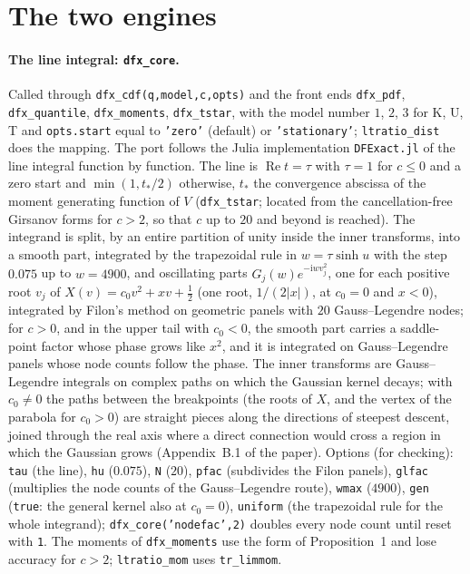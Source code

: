 \documentclass[11pt]{article}
\newcommand{\code}[1]{\texttt{#1}}
\newcommand{\iu}{{\mathrm i}}
\newcommand{\Rea}{\operatorname{Re}}
\begin{document}
\section{The two engines}
\label{sec:engines}

\paragraph{The line integral: \code{dfx\_core}.}  Called through \code{dfx\_cdf(q,model,c,opts)} and the front ends \code{dfx\_pdf}, \code{dfx\_quantile}, \code{dfx\_moments}, \code{dfx\_tstar}, with the model number $1$, $2$, $3$ for \textsf{K}, \textsf{U}, \textsf{T} and \code{opts.start} equal to \code{'zero'} (default) or \code{'stationary'}; \code{ltratio\_dist} does the mapping.  The port follows the Julia implementation \code{DFExact.jl} of the line integral function by function.  The line is $\Rea t=\tau$ with $\tau=1$ for $c\le0$ and a zero start and $\min(1,t_*/2)$ otherwise, $t_*$ the convergence abscissa of the moment generating function of $V$ (\code{dfx\_tstar}; located from the cancellation-free Girsanov forms for $c>2$, so that $c$ up to $20$ and beyond is reached).  The integrand is split, by an entire partition of unity inside the inner transforms, into a smooth part, integrated by the trapezoidal rule in $w=\tau\sinh u$ with the step $0.075$ up to $w=4900$, and oscillating parts $G_j(w)e^{-\iu wv_j^2}$, one for each positive root $v_j$ of $X(v)=c_0v^2+xv+\frac12$ (one root, $1/(2|x|)$, at $c_0=0$ and $x<0$), integrated by Filon's method on geometric panels with $20$ Gauss--Legendre nodes; for $c>0$, and in the upper tail with $c_0<0$, the smooth part carries a saddle-point factor whose phase grows like $x^2$, and it is integrated on Gauss--Legendre panels whose node counts follow the phase.  The inner transforms are Gauss--Legendre integrals on complex paths on which the Gaussian kernel decays; with $c_0\ne0$ the paths between the breakpoints (the roots of $X$, and the vertex of the parabola for $c_0>0$) are straight pieces along the directions of steepest descent, joined through the real axis where a direct connection would cross a region in which the Gaussian grows (Appendix~B.1 of the paper).  Options (for checking): \code{tau} (the line), \code{hu} ($0.075$), \code{N} ($20$), \code{pfac} (subdivides the Filon panels), \code{glfac} (multiplies the node counts of the Gauss--Legendre route), \code{wmax} ($4900$), \code{gen} (\code{true}: the general kernel also at $c_0=0$), \code{uniform} (the trapezoidal rule for the whole integrand); \code{dfx\_core('nodefac',2)} doubles every node count until reset with \code{1}.  The moments of \code{dfx\_moments} use the form of Proposition~1 and lose accuracy for $c>2$; \code{ltratio\_mom} uses \code{tr\_limmom}.
\end{document}
